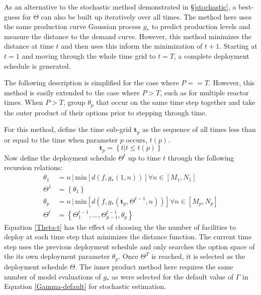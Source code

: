 As an alternative to the stochastic method demonstrated in \S\ref{stochastic}, 
a best-guess for $\Theta$ can also be built up iteratively over all times.
The method here uses the same production curve Gaussian process $g_*$ to 
predict production levels and measure the distance to the demand curve.
However, this method minimizes the distance at time
$t$ and then uses this inform the minimization of $t+1$. Starting at $t=1$
and moving through the whole time grid to $t=T$, a complete deployment 
schedule is generated.

The following description is simplified for the case where $P==T$. However, 
this method is easily extended to the case where $P > T$, such as for 
multiple reactor times.  When $P > T$, group $\theta_p$ that occur on the 
same time step together and take the outer product of their options prior to
stepping through time.

For this method, define the time sub-grid $\mathbf{t}_p$ as the sequence of
all times less than or equal to the time when parameter $p$ occurs, $t(p)$.
\begin{equation}
\label{t-p}
\mathbf{t}_p = \left\{t | t \le t(p)\right\}
\end{equation}
Now define the deployment schedule $\Theta^t$ up to time $t$ through the
following recursion relations:
\begin{equation}
\label{Theta-t}
\begin{split}
\theta_1 & = n \, | \, \mathrm{min}\left[d(f, g_*(1, n))\right]
                       \forall n\in[M_1, N_1] \\
\Theta^1 & = \left\{\theta_1\right\}\\
\theta_p & = n \, | \, \mathrm{min}\left[d(f, g_*(\mathbf{t}_p, 
                                                  \Theta^{t-1}, n))\right]
                       \forall n\in[M_p, N_p] \\
\Theta^t & = \left\{\Theta_1^{t-1}, \ldots, \Theta_{p-1}^{t-1}, \theta_p\right\}
\end{split}
\end{equation}
Equation \ref{Theta-t} has the effect of choosing the the number of 
facilities to deploy at each time step that minimizes the distance function.
The current time step uses the previous deployment schedule and only searches
the option space of the its own deployment parameter $\theta_p$. 
Once $\Theta^T$ is 
reached, it is selected as the deployment schedule $\Theta$. The inner 
product method here requires the same number of model evaluations of $g_*$ as 
were selected for the default value of $\Gamma$ in Equation 
\ref{Gamma-default} for stochastic estimation.



